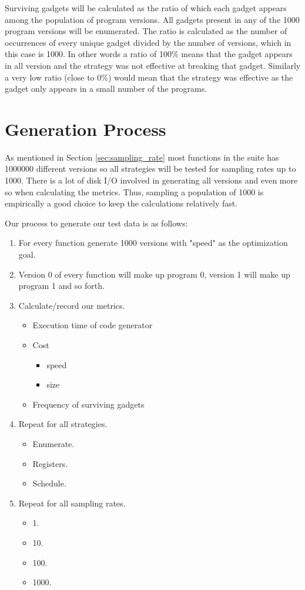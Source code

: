 Surviving gadgets will be calculated as the ratio of which each gadget appears among the
population of program versions. All gadgets present in any of the 1000 program versions
will be enumerated. The ratio is calculated as the number of occurrences of every unique
gadget divided by the number of versions, which in this case is 1000. In other words a
ratio of 100\% means that the gadget appears in all version and the strategy was not
effective at breaking that gadget. Similarly a very low ratio (close to 0\%) would mean
that the strategy was effective as the gadget only appears in a small number of the
programs.

\section{Generation Process}

As mentioned in Section \ref{sec:sampling_rate} most functions in the suite has 1000000
different versions so all strategies will be tested for sampling rates up to 1000. There
is a lot of disk I/O involved in generating all versions and even more so when calculating
the metrics. Thus, sampling a population of 1000 is empirically a good choice to keep the
calculations relatively fast.

Our process to generate our test data is as follows:

\begin{enumerate}
	\item For every function generate 1000 versions with "speed" as the optimization goal.
	\item Version 0 of every function will make up program 0, version 1 will make up program
		1 and so forth.
	\item Calculate/record our metrics.
		\begin{itemize}
			\item Execution time of code generator
			\item Cost
				\begin{itemize}
					\item speed
					\item size
				\end{itemize}
			\item Frequency of surviving gadgets
		\end{itemize}
	\item Repeat for all strategies.
		\begin{itemize}
			\item Enumerate.
			\item Registers.
			\item Schedule.
		\end{itemize}
	\item Repeat for all sampling rates.
		\begin{itemize}
			\item 1.
			\item 10.
			\item 100.
			\item 1000.
		\end{itemize}
\end{enumerate}

